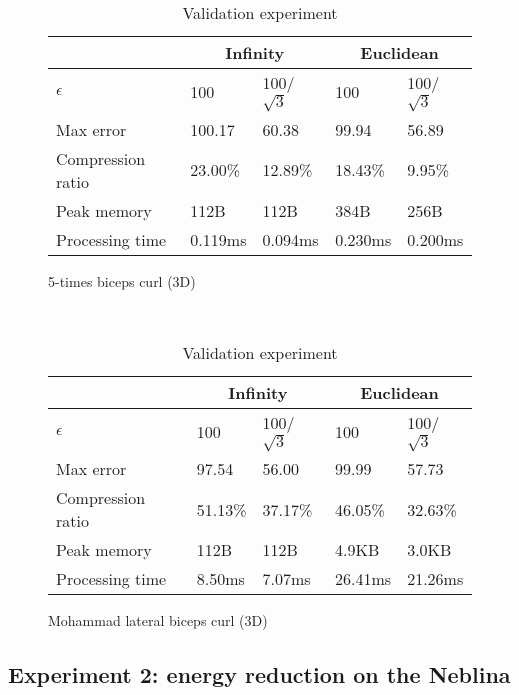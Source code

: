 \documentclass[10pt, conference, compsocconf]{IEEEtran}
\begin{document}
\begin{table}
\begin{subfigure}{\columnwidth}
    \centering
    \begin{tabular}{l|l|l|l|l}
    \hline
    \rowcolor{headcolor}
                            & \multicolumn{2}{c|}{Infinity} & \multicolumn{2}{c}{Euclidean} \\ \hline
    $\epsilon$             & 100          & 100/$\sqrt{3}$  & 100         & 100/$\sqrt{3}$   \\ 
    Max error              & 100.17       & 60.38           & 99.94       & 56.89            \\ 
    Compression ratio      & 23.00\%      & 12.89\%         & 18.43\%     & 9.95\%           \\ 
    Peak memory            & 112B         & 112B            & 384B        & 256B             \\ 
    Processing time        & 0.119ms      & 0.094ms         & 0.230ms     & 0.200ms          \\ \hline
    \end{tabular}
    \caption{5-times biceps curl (3D)}
    \end{subfigure}\\
    \begin{subfigure}{\columnwidth}
    \centering
    \begin{tabular}{l|l|l|l|l}
    \hline
    \rowcolor{headcolor}
                              & \multicolumn{2}{c|}{Infinity} & \multicolumn{2}{c}{Euclidean} \\ \hline
    $\epsilon$                & 100        & 100/$\sqrt{3}$    & 100        & 100/$\sqrt{3}$    \\
    Max error                 & 97.54     & 56.00             & 99.99      & 57.73             \\
    Compression ratio         & 51.13\%    & 37.17\%           & 46.05\%    & 32.63\%           \\
    Peak memory & 112B        & 112B              & 4.9KB      & 3.0KB             \\
    Processing time           & 8.50ms     & 7.07ms            & 26.41ms    & 21.26ms           \\ \hline
    \end{tabular}
    \caption{Mohammad lateral biceps curl (3D)}
    \end{subfigure}
    \caption{Validation experiment}
    \label{table:results-validation}
\end{table}

\subsection{Experiment 2: energy reduction on the Neblina}
\end{document}
